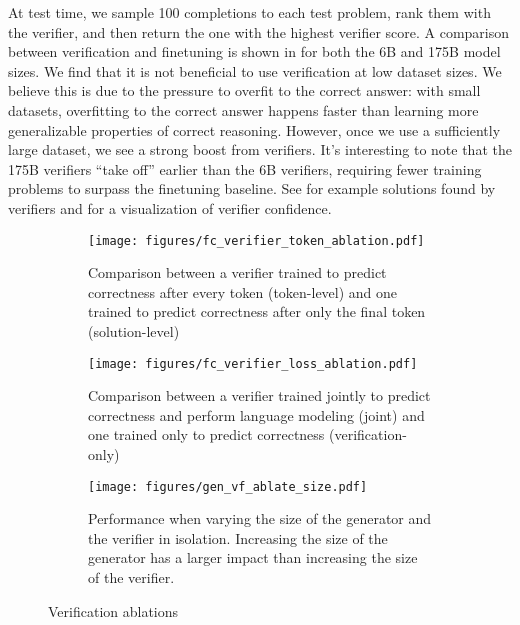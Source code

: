 {At test time, we sample 100 completions to each test problem, rank them with the verifier, and then return the one with the highest verifier score. A comparison between verification and finetuning is shown in  for both the 6B and 175B model sizes. We find that it is not beneficial to use verification at low dataset sizes. We believe this is due to the pressure to overfit to the correct answer: with small datasets, overfitting to the correct answer happens faster than learning more generalizable properties of correct reasoning. However, once we use a sufficiently large dataset, we see a strong boost from verifiers. It’s interesting to note that the 175B verifiers “take off” earlier than the 6B verifiers, requiring fewer training problems to surpass the finetuning baseline. See  for example solutions found by verifiers and  for a visualization of verifier confidence. 

\begin{figure}
\centering
\begin{subfigure}{0.32 \textwidth}
\texttt{[image: figures/fc\_verifier\_token\_ablation.pdf]}
\caption{Comparison between a verifier trained to predict correctness after every token (token-level) and one trained to predict correctness after only the final token (solution-level)} \label{fig:fc_verifier_token_ablation}
\end{subfigure}
\hspace*{\fill}
\begin{subfigure}{0.32 \textwidth}
\texttt{[image: figures/fc\_verifier\_loss\_ablation.pdf]}
\caption{Comparison between a verifier trained jointly to predict correctness and perform language modeling (joint) and one trained only to predict correctness (verification-only)} \label{fig:fc_verifier_loss_ablation}
\end{subfigure}
\hspace*{\fill}
\begin{subfigure}{0.32 \textwidth}
\texttt{[image: figures/gen\_vf\_ablate\_size.pdf]}
\caption{Performance when varying the size of the generator and the verifier in isolation. Increasing the size of the generator has a larger impact than increasing the size of the verifier.} \label{fig:gen_vf_ablate_size}
\end{subfigure}
\caption{Verification ablations}
\label{fig:fc_verifier_ablations}
\end{figure}

}
